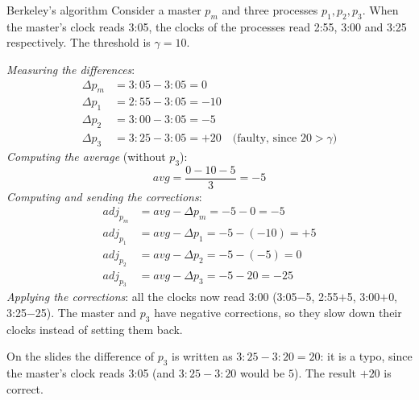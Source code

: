\begin{framedex}{Berkeley's algorithm}
  Consider a master $p_m$ and three processes $p_1, p_2, p_3$. When the master's clock reads 3:05, the clocks of the processes read 2:55, 3:00 and 3:25 respectively. The threshold is $\gamma = 10$.

  \textit{Measuring the differences}:
  \begin{align*}
    \Delta p_m &= 3{:}05 - 3{:}05 = 0 \\
    \Delta p_1 &= 2{:}55 - 3{:}05 = -10 \\
    \Delta p_2 &= 3{:}00 - 3{:}05 = -5 \\
    \Delta p_3 &= 3{:}25 - 3{:}05 = +20 \quad \text{(faulty, since } 20 > \gamma\text{)}
  \end{align*}
  \textit{Computing the average} (without $p_3$):
  \[\textit{avg} = \frac{0 - 10 - 5}{3} = -5\]
  \textit{Computing and sending the corrections}:
  \begin{align*}
    \textit{adj}_{p_m} &= \textit{avg} - \Delta p_m = -5 - 0 = -5 \\
    \textit{adj}_{p_1} &= \textit{avg} - \Delta p_1 = -5 - (-10) = +5 \\
    \textit{adj}_{p_2} &= \textit{avg} - \Delta p_2 = -5 - (-5) = 0 \\
    \textit{adj}_{p_3} &= \textit{avg} - \Delta p_3 = -5 - 20 = -25
  \end{align*}
  \textit{Applying the corrections}: all the clocks now read 3:00 (3:05$-$5, 2:55$+$5, 3:00$+$0, 3:25$-$25). The master and $p_3$ have negative corrections, so they slow down their clocks instead of setting them back.
\end{framedex}

\begin{framedobs}{}
  On the slides the difference of $p_3$ is written as $3{:}25 - 3{:}20 = 20$: it is a typo, since the master's clock reads 3:05 (and $3{:}25 - 3{:}20$ would be $5$). The result $+20$ is correct.
\end{framedobs}

